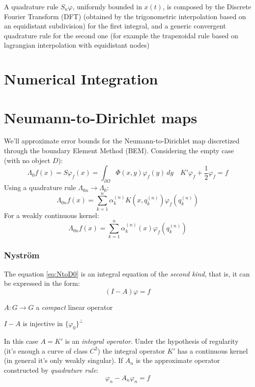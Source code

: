 \documentclass[10pt, a4paper, twoside, openright]{book}
\theoremstyle{definition}
\theoremstyle{plain}
\theoremstyle{plain}
\theoremstyle{plain}
\theoremstyle{plain}
\theoremstyle{plain}
\theoremstyle{plain}
\theoremstyle{plain}
\theoremstyle{plain}
\let\phi\varphi
\begin{document}
A quadrature rule $S_n\phi$, uniformly bounded in $x(t)$, is composed by the Discrete Fourier Transform (DFT) (obtained by the trigonometric interpolation based on an equidistant subdivision) for the first integral, and a generic convergent quadrature rule for the second one (for example the trapezoidal rule based on lagrangian interpolation with equidistant nodes) 

\section{Numerical Integration}
\section{Neumann-to-Dirichlet maps}
We'll approximate error bounds for the Neumann-to-Dirichlet map discretized through the boundary Element Method (BEM).
Considering the empty case (with no object $D$):
\begin{equation}
 \label{eq:NtoD0}
 \Lambda_0 f (x)= S\phi_f(x)=\int_{\partial\Omega}\Phi(x,y)\phi_f(y)\,dy \quad K'\phi_f+\frac{1}{2}\phi_f= f
\end{equation}
Using a quadrature rule $\Lambda_{0n} \to \Lambda_0$:
\begin{equation}
 \Lambda_{0n}f(x) = \sum_{k=1}^n\alpha_k^{(n)}K(x,q_k^{(n)})\phi_f(q_k^{(n)})
\end{equation}
For a weakly continuous kernel:
\begin{equation}
 \Lambda_{0n}f(x) = \sum_{k=1}^n\alpha_k^{(n)}(x)\phi_f(q_k^{(n)})
\end{equation}

\par
\subsubsection{Nystr\"om}
The equation \eqref{eq:NtoD0} is an integral equation of the \textit{second kind}, that is, it can be expressed in the form:
\begin{equation}
 (I - A) \phi = f
\end{equation}
\begin{center}
 $A: G \to G$ a \textit{compact} linear operator
\end{center}
\begin{center}
 $I-A$ is injective in $\{\phi_0\}^\perp$
\end{center}

In this case $A=K'$ is an \textit{integral operator}.
Under the hypothesis of regularity (it's enough a curve of class $C^2$) the integral operator $K'$ has a continuous kernel (in general it's only weakly singular).
If $A_n$ is the approximate operator constructed by \textit{quadrature rule}:
\begin{equation}
 \phi_n - A_n\phi_n = f
\end{equation}
\end{document}

